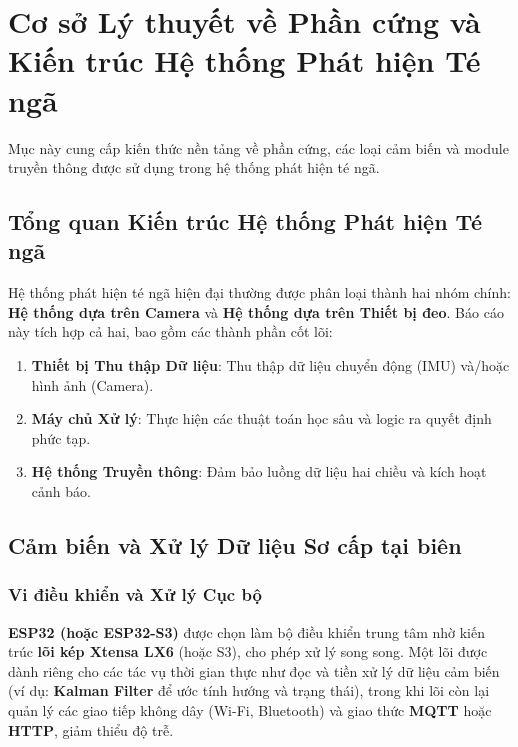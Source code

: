 \section{Cơ sở Lý thuyết về Phần cứng và Kiến trúc Hệ thống Phát hiện Té ngã}
\label{sec:hardware_theory}

Mục này cung cấp kiến thức nền tảng về phần cứng, các loại cảm biến và module truyền thông được sử dụng trong hệ thống phát hiện té ngã.

\subsection{Tổng quan Kiến trúc Hệ thống Phát hiện Té ngã}
Hệ thống phát hiện té ngã hiện đại thường được phân loại thành hai nhóm chính: \textbf{Hệ thống dựa trên Camera} và \textbf{Hệ thống dựa trên Thiết bị đeo}. Báo cáo này tích hợp cả hai, bao gồm các thành phần cốt lõi:
\begin{enumerate}
    \item \textbf{Thiết bị Thu thập Dữ liệu}: Thu thập dữ liệu chuyển động (IMU) và/hoặc hình ảnh (Camera).
    \item \textbf{Máy chủ Xử lý}: Thực hiện các thuật toán học sâu và logic ra quyết định phức tạp.
    \item \textbf{Hệ thống Truyền thông}: Đảm bảo luồng dữ liệu hai chiều và kích hoạt cảnh báo.
\end{enumerate}

\subsection{Cảm biến và Xử lý Dữ liệu Sơ cấp tại biên}

\subsubsection{Vi điều khiển và Xử lý Cục bộ}
\textbf{ESP32 (hoặc ESP32-S3)} được chọn làm bộ điều khiển trung tâm nhờ kiến trúc \textbf{lõi kép Xtensa LX6} (hoặc S3), cho phép xử lý song song. Một lõi được dành riêng cho các tác vụ thời gian thực như đọc và tiền xử lý dữ liệu cảm biến (ví dụ: \textbf{Kalman Filter} để ước tính hướng và trạng thái), trong khi lõi còn lại quản lý các giao tiếp không dây (Wi-Fi, Bluetooth) và giao thức \textbf{MQTT} hoặc \textbf{HTTP}, giảm thiểu độ trễ.

